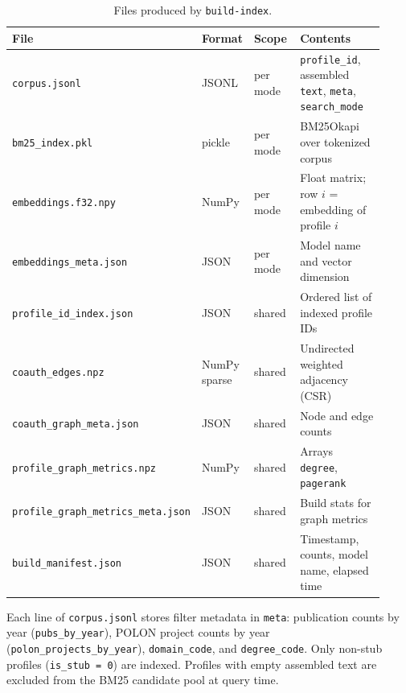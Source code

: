 \documentclass{article}
\begin{document}
\begin{table}[htbp]
  \centering
  \caption{Files produced by \texttt{build-index}.}
  \label{tab:artifacts}
  \small
  \begin{tabular}{@{}p{0.34\linewidth}p{0.12\linewidth}p{0.14\linewidth}p{0.32\linewidth}@{}}
    \toprule
    File & Format & Scope & Contents \\
    \midrule
    \texttt{corpus.jsonl} & JSONL & per mode & \texttt{profile\_id}, assembled \texttt{text}, \texttt{meta}, \texttt{search\_mode} \\
    \texttt{bm25\_index.pkl} & pickle & per mode & BM25Okapi over tokenized corpus \\
    \texttt{embeddings.f32.npy} & NumPy & per mode & Float matrix; row $i$ = embedding of profile $i$ \\
    \texttt{embeddings\_meta.json} & JSON & per mode & Model name and vector dimension \\
    \texttt{profile\_id\_index.json} & JSON & shared & Ordered list of indexed profile IDs \\
    \texttt{coauth\_edges.npz} & NumPy sparse & shared & Undirected weighted adjacency (CSR) \\
    \texttt{coauth\_graph\_meta.json} & JSON & shared & Node and edge counts \\
    \texttt{profile\_graph\_metrics.npz} & NumPy & shared & Arrays \texttt{degree}, \texttt{pagerank} \\
    \texttt{profile\_graph\_metrics\_meta.json} & JSON & shared & Build stats for graph metrics \\
    \texttt{build\_manifest.json} & JSON & shared & Timestamp, counts, model name, elapsed time \\
    \bottomrule
  \end{tabular}
\end{table}

Each line of \texttt{corpus.jsonl} stores filter metadata in \texttt{meta}: publication counts by year (\texttt{pubs\_by\_year}), POLON project counts by year (\texttt{polon\_projects\_by\_year}), \texttt{domain\_code}, and \texttt{degree\_code}. Only non-stub profiles (\texttt{is\_stub = 0}) are indexed. Profiles with empty assembled text are excluded from the BM25 candidate pool at query time.
\end{document}
